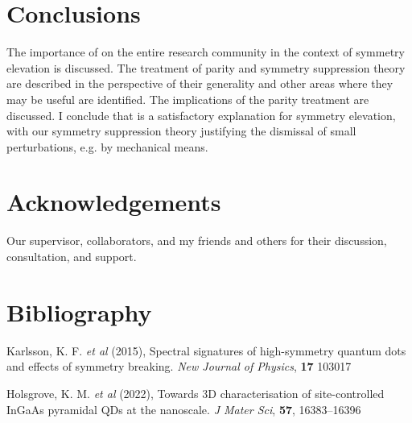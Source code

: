 \documentclass[12pt]{article}
\begin{document}
\section{Conclusions}

The importance of \cite{hexagon} on the entire research community in the context of symmetry elevation is discussed. The treatment of parity and symmetry suppression theory are described in the perspective of their generality and other areas where they may be useful are identified. The implications of the parity treatment are discussed. I conclude that \cite{hexagon} is a satisfactory explanation for symmetry elevation, with our symmetry suppression theory justifying the dismissal of small perturbations, e.g. by mechanical means.

\section{Acknowledgements}
Our supervisor, collaborators, and my friends and others for their discussion, consultation, and support.

\section{Bibliography}

\begin{thebibliography}{10}

Karlsson, K. F. \textit{et al} (2015), Spectral signatures of high-symmetry quantum dots and effects of symmetry breaking. \textit{New Journal of Physics}, \textbf{17} 103017

Holsgrove, K. M. \textit{et al} (2022), Towards 3D characterisation of site-controlled InGaAs pyramidal QDs at the nanoscale. \textit{J Mater Sci}, \textbf{57}, 16383--16396

\end{thebibliography}



%





\end{document}
